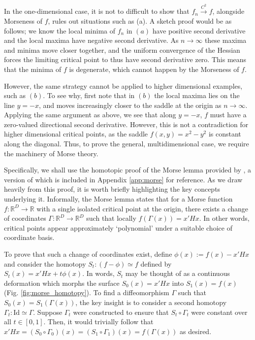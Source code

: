 \documentclass[11pt]{article}
\newcommand{\1}{\mathbf{1}}
\theoremstyle{definition}
\theoremstyle{remark}
\begin{document}
In the one-dimensional case, it is not to difficult to show that $f_n\xrightarrow{C^2}f$, alongside Morseness of $f$, rules out situations such as (a). A sketch proof would be as follows; we know the local minima of $f_n$ in $(a)$ have positive second derivative and the local maxima have negative second derivative. As $n\rightarrow \infty$ these maxima and minima move closer together, and the uniform convergence of the Hessian forces the limiting critical point to thus have second derivative zero. This means that the minima of $f$ is degenerate, which cannot happen by the Morseness of $f$.

However, the same strategy cannot be applied to higher dimensional examples, such as $(b)$. To see why, first note that in $(b)$ the local maxima lies on the line $y=-x$, and moves increasingly closer to the saddle at the origin as $n\rightarrow \infty$. Applying the same argument as above, we see that along $y=-x$, $f$ must have a zero-valued directional second derivative. However, this is not a contradiction for higher dimensional critical points, as the saddle $f(x,y)=x^2-y^2$ is constant along the diagonal. Thus, to prove the general, multidimensional case, we require the machinery of Morse theory.

Specifically, we shall use the homotopic proof of the Morse lemma provided by \cite{ioffe1997}, a version of which is included in Appendix \ref{app:morse} for reference. As we draw heavily from this proof, it is worth briefly highlighting the key concepts underlying it. Informally, the Morse lemma states that for a Morse function $f:\mathbb{R}^D\rightarrow \mathbb{R}$ with a single isolated critical point at the origin, there exists a change of coordinates $\Gamma:\mathbb{R}^D\rightarrow \mathbb{R}^D$ such that locally $f(\Gamma(x))=x'Hx$. In other words, critical points appear approximately `polynomial' under a suitable choice of coordinate basis.

To prove that such a change of coordinates exist, \cite{ioffe1997} define $\phi(x):=f(x)-x'Hx$ and consider the homotopy $S_t:(f-\phi)\simeq f$ defined by $S_t(x)=x'Hx+t\phi(x)$. In words, $S_t$ may be thought of as a continuous deformation which morphs the surface $S_0(x)=x'Hx$ into $S_1(x)=f(x)$ (Fig. \ref{fig:morse_homotopy}). To find a diffeomorphism $\Gamma$ such that $S_0(x)=S_1(\Gamma(x))$, the key insight is to consider a second homotopy $\Gamma_t:\text{Id}\simeq \Gamma$. Suppose $\Gamma_t$ were constructed to ensure that $S_t \circ \Gamma_t$ were constant over all $t\in [0,1]$. Then, it would trivially follow that $x'Hx=(S_0 \circ \Gamma_0)(x)=(S_1 \circ \Gamma_1)(x)=f(\Gamma(x))$ as desired.
\end{document}
